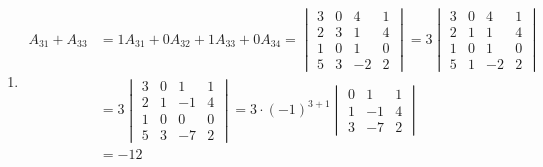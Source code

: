 \begin{enumerate}
\begin{enumerate}
              \item \begin{align*}
                        A_{31}+A_{33}
                         & = 1A_{31}+0A_{32}+1A_{33}+0A_{34}
                        = \begin{vmatrix}
                              3 & 0 & 4  & 1 \\
                              2 & 3 & 1  & 4 \\
                              1 & 0 & 1  & 0 \\
                              5 & 3 & -2 & 2
                          \end{vmatrix}
                        = 3 \begin{vmatrix}
                                3 & 0 & 4  & 1 \\
                                2 & 1 & 1  & 4 \\
                                1 & 0 & 1  & 0 \\
                                5 & 1 & -2 & 2
                            \end{vmatrix}                   \\
                         & = 3 \begin{vmatrix}
                                   3 & 0 & 1  & 1 \\
                                   2 & 1 & -1 & 4 \\
                                   1 & 0 & 0  & 0 \\
                                   5 & 3 & -7 & 2
                               \end{vmatrix}
                        = 3 \cdot (-1)^{3+1} \begin{vmatrix}
                                                 0 & 1  & 1 \\
                                                 1 & -1 & 4 \\
                                                 3 & -7 & 2
                                             \end{vmatrix}  \\
                         & = -12
                    \end{align*}


\end{enumerate}
\end{enumerate}
